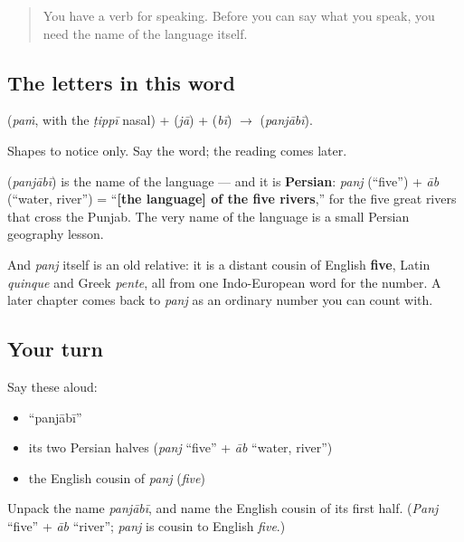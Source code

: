 \begin{quote}
You have a verb for speaking. Before you can say what you speak, you need the name of the language itself.
\end{quote}

\subsection*{The letters in this word}
\textbf{} (\emph{paṁ}, with the \emph{ṭippī} nasal) + \textbf{} (\emph{jā}) + \textbf{} (\emph{bī}) $\to$ \textbf{} (\emph{panjābī}).

Shapes to notice only. Say the word; the reading comes later.

\begin{cousinweb}
\textbf{} (\emph{panjābī}) is the name of the language — and it is \textbf{Persian}: \emph{panj} (\textquotedblleft{}five\textquotedblright{}) + \emph{āb} (\textquotedblleft{}water, river\textquotedblright{}) = \textquotedblleft{}\textbf{{[}the language{]} of the five rivers},\textquotedblright{} for the five great rivers that cross the Punjab. The very name of the language is a small Persian geography lesson.

And \emph{panj} itself is an old relative: it is a distant cousin of English \textbf{five}, Latin \emph{quinque} and Greek \emph{pente}, all from one Indo-European word for the number. A later chapter comes back to \emph{panj} as an ordinary number you can count with.
\end{cousinweb}

\subsection*{Your turn}
Say these aloud:

\begin{itemize}
\raggedright
  \item \textquotedblleft{}panjābī\textquotedblright{}
  \item its two Persian halves (\emph{panj} \textquotedblleft{}five\textquotedblright{} + \emph{āb} \textquotedblleft{}water, river\textquotedblright{})
  \item the English cousin of \emph{panj} (\emph{five})
\end{itemize}

\begin{tcolorbox}[breakable,colback=teal!4,colframe=teal!35!black,title={Before you move on}]
Unpack the name \emph{panjābī}, and name the English cousin of its first half. (\emph{Panj} \textquotedblleft{}five\textquotedblright{} + \emph{āb} \textquotedblleft{}river\textquotedblright{}; \emph{panj} is cousin to English \emph{five}.)
\end{tcolorbox}
